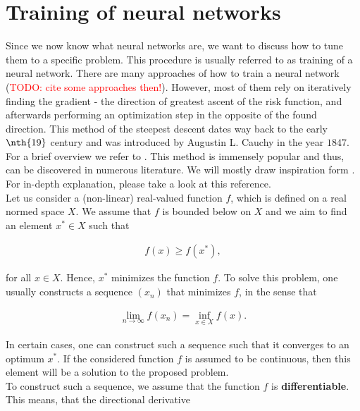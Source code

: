 \section{Training of neural networks}\label{sec:training_of_nn}
Since we now know what neural networks are, we want to discuss how to tune them to a specific problem. This procedure is usually referred to as training of a neural network. There are many approaches of how to train a neural network (\textcolor{red}{TODO: cite some approaches then!}). However, most of them rely on iteratively finding the gradient - the direction of greatest ascent of the risk function, and afterwards performing an optimization step in the opposite of the found direction. This method of the steepest descent dates way back to the early $\nth{19}$ century and was introduced by Augustin L. Cauchy in the year $1847$. For a brief overview we refer to \cite{lemarechal2012cauchy}. This method is immensely popular and thus, can be discovered in numerous literature. We will mostly draw inspiration form \cite[Chapter~XV]{kantorovich2016functional}. For in-depth explanation, please take a look at this reference.\\
Let us consider a (non-linear) real-valued function $f$, which is defined on a real normed space $X$. We assume that $f$ is bounded below on $X$ and we aim to find an element $x^{\ast}\in X$ such that

\begin{align*}
f(x) \geq f(x^{\ast}),
\end{align*}

for all $x\in X$. Hence, $x^{\ast}$ minimizes the function $f$. To solve this problem, one usually constructs a sequence $(x_n)$ that minimizes $f$, in the sense that

\begin{align*}
\lim_{n\to\infty} f(x_n) = \inf_{x\in X} f(x).
\end{align*}

In certain cases, one can construct such a sequence such that it converges to an optimum $x^{\ast}$. If the considered function $f$ is assumed to be continuous, then this element will be a solution to the proposed problem.\\
To construct such a sequence, we assume that the function $f$ is \textbf{differentiable}. This means, that the directional derivative

